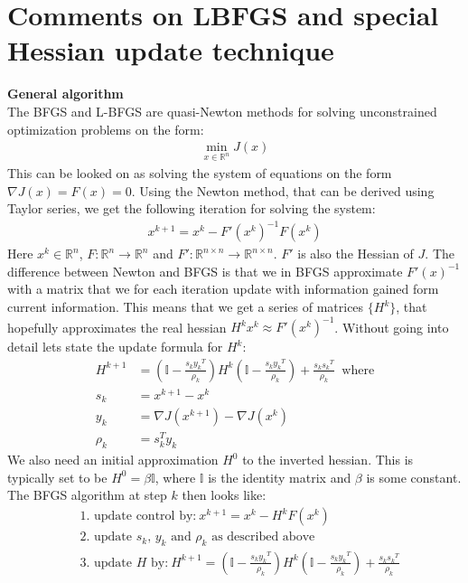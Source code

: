 \documentclass[11pt,a4paper]{article}
\begin{document}
\section*{Comments on LBFGS and special Hessian update technique}
\textbf{General algorithm}
\\
The BFGS and L-BFGS are quasi-Newton methods for solving unconstrained optimization problems on the form:
\begin{align*}
\min_{x \in \mathbb{R}^n} J(x)
\end{align*} 
This can be looked on as solving the system of equations on the form \\$\nabla J(x) = F(x)=0$. Using the Newton method, that can be derived using Taylor series, we get the following iteration for solving the system:
\begin{align*}
x^{k+1} = x^k - F'(x^k)^{-1}F(x^k)
\end{align*}
Here $x^k \in \mathbb{R}^n$, $F:\mathbb{R}^n \rightarrow \mathbb{R}^n$ and $F':\mathbb{R}^{n\times n} \rightarrow \mathbb{R}^{n\times n}$. $F'$ is also the Hessian of $J$. The difference between Newton and BFGS is that we in BFGS approximate $F'(x)^{-1}$ with a matrix that we for each iteration update with information gained form current information. This means that we get a series of matrices $\{H^k\}$, that hopefully approximates the real hessian $H^kx^k \approx F'(x^k)^{-1}$. Without going into detail lets state the update formula for $H^k$:
\begin{align*}
H^{k+1} &= (\mathbb{I} - \frac{s_k {y_k}^T}{\rho_k})H^k(\mathbb{I} - \frac{s_k {y_k}^T}{\rho_k}) + \frac{s_k {s_k}^T}{\rho_k} \ \text{ where} \\
s_k &= x^{k+1} - x^k \\
y_k &= \nabla J(x^{k+1}) - \nabla J(x^k) \\
\rho_k &= s_k^Ty_k
\end{align*} 
We also need an initial approximation $H^0$ to the inverted hessian. This is typically set to be $H^0 = \beta\mathbb{I}$, where $\mathbb{I}$ is the identity matrix and $\beta$ is some constant. The BFGS algorithm at step $k$ then looks like:
\begin{align*}
&\text{1. update control by:} \ x^{k+1}= x^{k} - H^kF(x^{k}) \\
&\text{2. update $s_k$, $y_k$ and $\rho_k$ as described above} \\
&\text{3. update $H$ by:} \ H^{k+1} = (\mathbb{I} - \frac{s_k {y_k}^T}{\rho_k})H^k(\mathbb{I} - \frac{s_k {y_k}^T}{\rho_k}) + \frac{s_k {s_k}^T}{\rho_k}
\end{align*}
\end{document}
